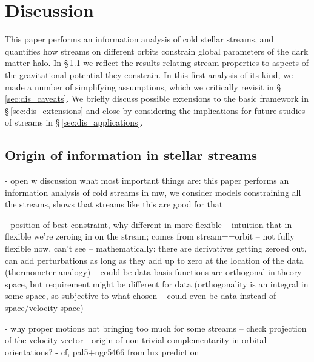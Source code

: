 \documentclass[modern]{aastex61}
\begin{document}
\section{Discussion}
\label{sec:discussion}
This paper performs an information analysis of cold stellar streams, and quantifies how streams on different orbits constrain global parameters of the dark matter halo.
In \S\,\ref{sec:dis_origin} we reflect the results relating stream properties to aspects of the gravitational potential they constrain.
In this first analysis of its kind, we made a number of simplifying assumptions, which we critically revisit in \S\,\ref{sec:dis_caveats}.
We briefly discuss possible extensions to the basic framework in \S\,\ref{sec:dis_extensions} and close by considering the implications for future studies of streams in \S\,\ref{sec:dis_applications}.

\subsection{Origin of information in stellar streams}
\label{sec:dis_origin}
- open w discussion what most important things are: this paper performs an information analysis of cold streams in mw, we consider models constraining all the streams, shows that streams like this are good for that

- position of best constraint, why different in more flexible
-- intuition that in flexible we're zeroing in on the stream; comes from stream==orbit
-- not fully flexible now, can't see
-- mathematically: there are derivatives getting zeroed out, can add perturbations as long as they add up to zero at the location of the data (thermometer analogy)
-- could be data basis functions are orthogonal in theory space, but requirement might be different for data (orthogonality is an integral in some space, so subjective to what chosen -- could even be data instead of space/velocity space)

- why proper motions not bringing too much for some streams -- check projection of the velocity vector
- origin of non-trivial complementarity in orbital orientations?
- cf, pal5+ngc5466 from lux prediction
\end{document}
